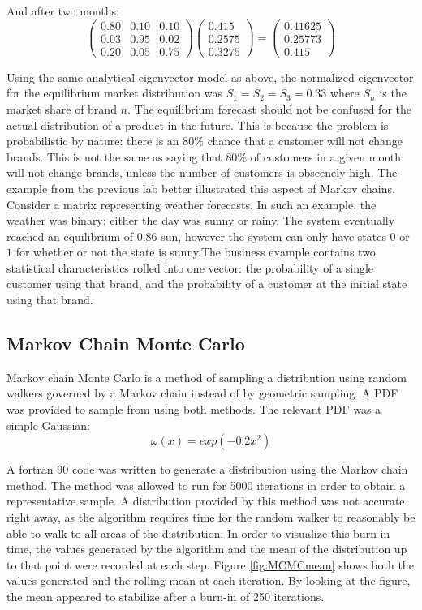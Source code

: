 \message{ !name(Assn1.tex)}\documentclass[twocolumn]{article}
\begin{document}
And after two months:
\[
\begin{pmatrix}
0.80 & 0.10 & 0.10 \\
0.03 & 0.95 & 0.02 \\ 
0.20 & 0.05 & 0.75
\end{pmatrix} \begin{pmatrix} 0.415 \\ 0.2575 \\ 0.3275 \end{pmatrix} = \begin{pmatrix} 0.41625 \\ 0.25773 \\ 0.415 \end{pmatrix}
\]

Using the same analytical eigenvector model as above, the normalized eigenvector for the equilibrium market distribution was $S_1 = S_2 = S_3 = 0.33$ where $S_n$ is the market share of brand $n$. The equilibrium forecast should not be confused for the actual distribution of a product in the future. This is because the problem is probabilistic by nature: there is an $80\%$ chance that a customer will not change brands. This is not the same as saying that $80\%$ of customers in a given month will not change brands, unless the number of customers is obscenely high. The example from the previous lab better illustrated this aspect of Markov chains. Consider a matrix representing weather forecasts. In such an example, the weather was binary: either the day was sunny or rainy. The system eventually reached an equilibrium of $0.86$ sun, however the system can only have states $0$ or $1$ for whether or not the state is sunny.The business example contains two statistical characteristics rolled into one vector: the probability of a single customer using that brand, and the probability of a customer at the initial state using that brand.

\subsection{Markov Chain Monte Carlo}
 Markov chain Monte Carlo is a method of sampling a distribution using random walkers governed by a Markov chain instead of by geometric sampling. A PDF was provided to sample from using both methods. The relevant PDF was a simple Gaussian:
 \begin{equation}
 \omega(x) = exp(-0.2x^2)
 \label{lilgauss}
 \end{equation}
 
 A fortran 90 code was written to generate a distribution using the Markov chain method. The method was allowed to run for 5000 iterations in order to obtain a representative sample. A distribution provided by this method was not accurate right away, as the algorithm requires time for the random walker to reasonably be able to walk to all areas of the distribution. In order to visualize this burn-in time, the values generated by the algorithm and the mean of the distribution up to that point were recorded at each step. Figure \ref{fig:MCMCmean} shows both the values generated and the rolling mean at each iteration. By looking at the figure, the mean appeared to stabilize after a burn-in of 250 iterations. 
 
\end{document}
